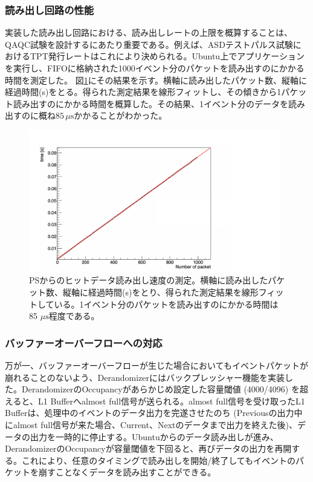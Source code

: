 \subsubsection{読み出し回路の性能}
\baselineskip
実装した読み出し回路における、読み出しレートの上限を概算することは、QAQC試験を設計するにあたり重要である。例えば、ASDテストパルス試験におけるTPT発行レートはこれにより決められる。Ubuntu上でアプリケーションを実行し、FIFOに格納された1000イベント分のパケットを読み出すのにかかる時間を測定した。
図\ref{JTAHubreadspeed}にその結果を示す。横軸に読み出したパケット数、縦軸に経過時間(s)をとる。得られた測定結果を線形フィットし、その傾きから1パケット読み出すのにかかる時間を概算した。その結果、1イベント分のデータを読み出すのに概ね$85\,\mu\mathrm{s}$かかることがわかった。

\begin{figure} 
\centering
\includegraphics[width=11cm]{fig/QAQC/JATHubreadspeed.pdf}
\caption[PSからのヒットデータ読み出し速度の測定]{PSからのヒットデータ読み出し速度の測定。横軸に読み出したパケット数、縦軸に経過時間(s)をとり、得られた測定結果を線形フィットしている。1イベント分のパケットを読み出すのにかかる時間は85 $\mu\mathrm{s}$程度である。}
\label{JTAHubreadspeed}
\end{figure}

\subsubsection{バッファーオーバーフローへの対応} 
\baselineskip
万が一、バッファーオーバーフローが生じた場合においてもイベントパケットが崩れることのないよう、Derandomizerにはバックプレッシャー機能を実装した。DerandomizerのOccupancyがあらかじめ設定した容量閾値 (4000/4096) を超えると、L1 Bufferへalmost full信号が送られる。almost full信号を受け取ったL1 Bufferは、処理中のイベントのデータ出力を完遂させたのち (Previousの出力中にalmost full信号が来た場合、Current、Nextのデータまで出力を終えた後)、データの出力を一時的に停止する。Ubuntuからのデータ読み出しが進み、DerandomizerのOccupancyが容量閾値を下回ると、再びデータの出力を再開する。これにより、任意のタイミングで読み出しを開始/終了してもイベントのパケットを崩すことなくデータを読み出すことができる。

